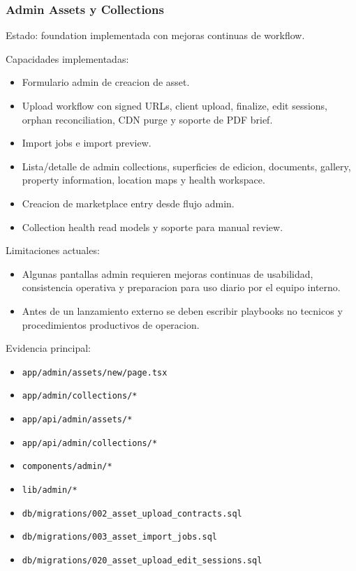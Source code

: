 \documentclass[
  10pt,
  letterpaper,
]{article}
\providecommand{\tightlist}{%
  \setlength{\itemsep}{0pt}\setlength{\parskip}{0pt}}
\let\oldtexttt\texttt
\renewcommand{\texttt}[1]{\oldtexttt{\small #1}}
\begin{document}
\subsubsection{Admin Assets y
Collections}\label{admin-assets-y-collections}

Estado: foundation implementada con mejoras continuas de workflow.

Capacidades implementadas:

\begin{itemize}
\tightlist
\item
  Formulario admin de creacion de asset.
\item
  Upload workflow con signed URLs, client upload, finalize, edit
  sessions, orphan reconciliation, CDN purge y soporte de PDF brief.
\item
  Import jobs e import preview.
\item
  Lista/detalle de admin collections, superficies de edicion, documents,
  gallery, property information, location maps y health workspace.
\item
  Creacion de marketplace entry desde flujo admin.
\item
  Collection health read models y soporte para manual review.
\end{itemize}

Limitaciones actuales:

\begin{itemize}
\tightlist
\item
  Algunas pantallas admin requieren mejoras continuas de usabilidad,
  consistencia operativa y preparacion para uso diario por el equipo
  interno.
\item
  Antes de un lanzamiento externo se deben escribir playbooks no
  tecnicos y procedimientos productivos de operacion.
\end{itemize}

Evidencia principal:

\begin{itemize}
\tightlist
\item
  \texttt{app/admin/assets/new/page.tsx}
\item
  \texttt{app/admin/collections/*}
\item
  \texttt{app/api/admin/assets/*}
\item
  \texttt{app/api/admin/collections/*}
\item
  \texttt{components/admin/*}
\item
  \texttt{lib/admin/*}
\item
  \texttt{db/migrations/002\_asset\_upload\_contracts.sql}
\item
  \texttt{db/migrations/003\_asset\_import\_jobs.sql}
\item
  \texttt{db/migrations/020\_asset\_upload\_edit\_sessions.sql}
\end{itemize}
\end{document}
